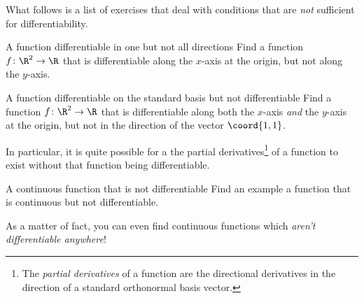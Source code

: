 What follows is a list of exercises that deal with conditions that are \emph{not} sufficient for differentiability.
\begin{exr}{A function differentiable in one but not all directions}{}
Find a function $f\colon \R ^2\rightarrow \R$ that is differentiable along the $x$-axis at the origin, but not along the $y$-axis.
\end{exr}
\begin{exr}{A function differentiable on the standard basis but not differentiable}{}
Find a function $f\colon \R ^2\rightarrow \R$ that is differentiable along both the $x$-axis \emph{and} the $y$-axis at the origin, but not in the direction of the vector $\coord{1,1}$.
\begin{rmk}
In particular, it is quite possible for a the partial derivatives\footnote{The \emph{partial derivatives} of a function are the directional derivatives in the direction of a standard orthonormal basis vector.} of a function to exist without that function being differentiable.
\end{rmk}
\end{exr}
\begin{exr}{A continuous function that is not differentiable}{}
Find an example a function that is continuous but not differentiable.
\end{exr}
As a matter of fact, you can even find continuous functions which \emph{aren't differentiable anywhere}!
